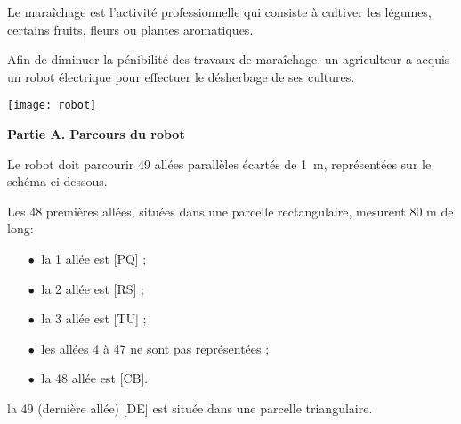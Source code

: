 
\medskip  

\parbox{0.78\linewidth}{Le maraîchage est l'activité professionnelle qui consiste à cultiver les légumes, certains fruits, fleurs ou plantes aromatiques.

Afin de diminuer la pénibilité des travaux de maraîchage, un agriculteur a
acquis un robot électrique pour effectuer le désherbage de ses cultures.}\hfill
\parbox{0.2\linewidth}{\texttt{[image: robot]}}

\bigskip

\textbf{Partie A. Parcours du robot}

\medskip

Le robot doit parcourir 49 allées parallèles écartés de 1~m, représentées sur le schéma ci-dessous.

Les 48 premières allées, situées dans une parcelle rectangulaire, mesurent 80 m de long:

\setlength\parindent{4mm}
\begin{itemize}
\item[$\bullet~$] la 1 allée est [PQ] ; 
\item[$\bullet~$] la 2 allée est [RS] ; 
\item[$\bullet~$] la 3 allée est [TU] ; 
\item[$\bullet~$] les allées 4 à 47 ne sont pas représentées ; 
\item[$\bullet~$] la 48 allée est [CB]. 
\end{itemize}
\setlength\parindent{0mm}

la 49 (dernière allée) [DE] est située dans une parcelle triangulaire.

\medskip
 
